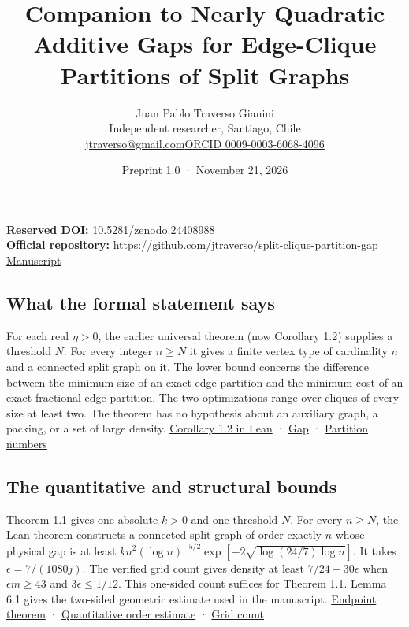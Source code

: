 \documentclass[english,11pt,a4paper]{article}
\title{Companion to Nearly Quadratic Additive Gaps for Edge-Clique Partitions of Split Graphs}
\author{Juan Pablo Traverso Gianini\\\small Independent researcher, Santiago, Chile\\\small\href{mailto:jtraverso@gmail.com}{jtraverso@gmail.com}\quad\href{https://orcid.org/0009-0003-6068-4096}{ORCID 0009-0003-6068-4096}}
\date{Preprint 1.0 \enspace · \enspace November 21, 2026}
\begin{document}
\raggedbottom\maketitle
\noindent\textbf{Reserved DOI:} 10.5281/zenodo.24408988\\
\textbf{Official repository:} \url{https://github.com/jtraverso/split-clique-partition-gap}\\
\href{https://github.com/jtraverso/split-clique-partition-gap/blob/main/preprints/SPLITGAP/01_manuscript/split-gap-en.pdf}{Manuscript}
\subsection{What the formal statement says}\label{what-the-formal-statement-says}

For each real \(\eta>0\), the earlier universal theorem (now Corollary 1.2) supplies a threshold \(N\). For every integer \(n\ge N\) it gives a finite vertex type of cardinality \(n\) and a connected split graph on it. The lower bound concerns the difference between the minimum size of an exact edge partition and the minimum cost of an exact fractional edge partition. The two optimizations range over cliques of every size at least two. The theorem has no hypothesis about an auxiliary graph, a packing, or a set of large density. \href{https://github.com/jtraverso/split-clique-partition-gap/blob/ccb5444b2ecdff9de1d6221133633a25a224953d/R434/UniversalR434.lean}{Corollary 1.2 in Lean} · \href{https://github.com/jtraverso/split-clique-partition-gap/blob/ccb5444b2ecdff9de1d6221133633a25a224953d/GapExtremal/Defs.lean}{Gap} · \href{https://github.com/jtraverso/split-clique-partition-gap/blob/ccb5444b2ecdff9de1d6221133633a25a224953d/GraphBase/Clique/Partition.lean}{Partition numbers}

\subsection{The quantitative and structural bounds}\label{the-quantitative-and-structural-bounds}

Theorem 1.1 gives one absolute \(k>0\) and one threshold \(N\). For every \(n\ge N\), the Lean theorem constructs a connected split graph of order exactly \(n\) whose physical gap is at least \(k n^2(\log n)^{-5/2}\exp[-2\sqrt{\log(24/7)\log n}]\). It takes \(\epsilon=7/(1080j)\). The verified grid count gives density at least \(7/24-30\epsilon\) when \(\epsilon m\ge43\) and \(3\epsilon\le1/12\). This one-sided count suffices for Theorem 1.1. Lemma 6.1 gives the two-sided geometric estimate used in the manuscript. \href{https://github.com/jtraverso/split-clique-partition-gap/blob/ccb5444b2ecdff9de1d6221133633a25a224953d/R434/PolylogGap.lean}{Endpoint theorem} · \href{https://github.com/jtraverso/split-clique-partition-gap/blob/ccb5444b2ecdff9de1d6221133633a25a224953d/R434/PolylogOrder.lean}{Quantitative order estimate} · \href{https://github.com/jtraverso/split-clique-partition-gap/blob/ccb5444b2ecdff9de1d6221133633a25a224953d/R434/DensityThreshold.lean}{Grid count}
\end{document}
